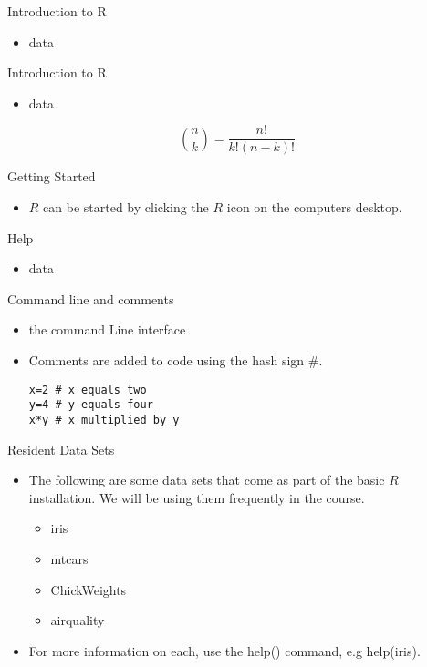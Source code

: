 \documentclass[pdf,default,slideColor,colorBG]{prosper}
\begin{document}
\begin{slide}{Introduction to R}
\begin{itemize}
\item data
\end{itemize}
\end{slide}
\begin{slide}{Introduction to R}
\begin{itemize}
\item data
\end{itemize}
\begin{equation}
{n \choose k} = \frac{n!}{k! (n-k)!}
\end{equation}
\end{slide}
\begin{slide}{Getting Started}
\begin{itemize}
\item $R$ can be started by clicking the $R$ icon on the computers desktop.
\end{itemize}
\end{slide}
\begin{slide}{Help}
\begin{itemize}
\item data
\end{itemize}
\end{slide}
\begin{slide}{Command line and comments}
\begin{itemize}
\item the command Line interface \item Comments are added to code
using the hash sign $\#$.
\begin{verbatim}
x=2 # x equals two
y=4 # y equals four
x*y # x multiplied by y
\end{verbatim}
\end{itemize}
\end{slide}
\begin{slide}{Resident Data Sets}
\begin{itemize}
\item The following are some data sets that come as part of the
basic $R$ installation. We will be using them frequently in the
course.
\begin{itemize}
\item iris \item mtcars \item ChickWeights \item airquality
\end{itemize}
\item For more information on each, use the help() command, e.g
help(iris).
\end{itemize}
\end{slide}
\end{document}
